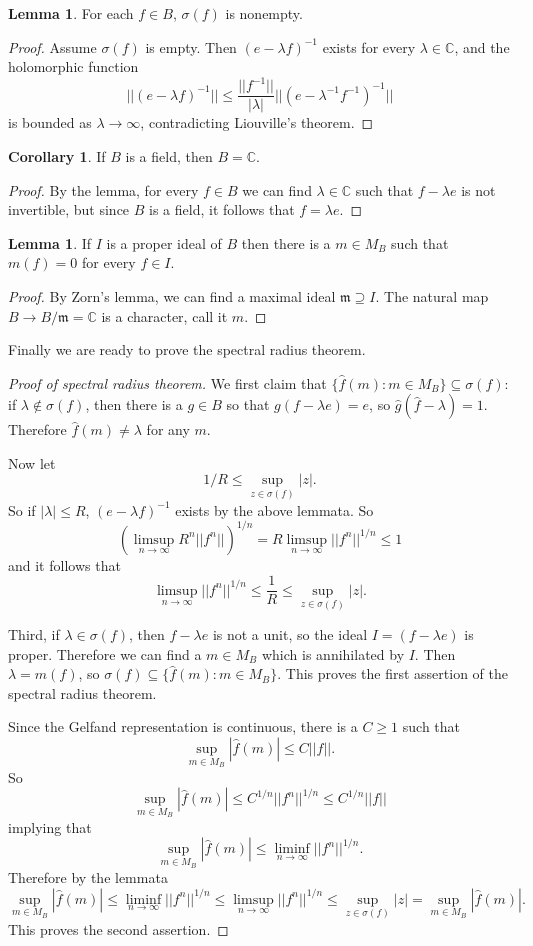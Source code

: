 \documentclass[12pt]{report}
\newcommand{\CC}{\mathbb{C}}
\theoremstyle{definition}
\newtheorem{lemma}[theorem]{Lemma}
\newtheorem{corollary}[theorem]{Corollary}
\begin{document}
\begin{lemma}
    For each $f \in B$, $\sigma(f)$ is nonempty.
\end{lemma}
\begin{proof}
    Assume $\sigma(f)$ is empty. Then $(e - \lambda f)^{-1}$ exists for every $\lambda \in \CC$, and the holomorphic function
    $$||(e - \lambda f)^{-1}|| \leq \frac{||f^{-1}||}{|\lambda|}||(e - \lambda^{-1}f^{-1})^{-1}||$$
    is bounded as $\lambda\to \infty$, contradicting Liouville's theorem.
\end{proof}
\begin{corollary}
    If $B$ is a field, then $B = \CC$.
\end{corollary}
\begin{proof}
    By the lemma, for every $f \in B$ we can find $\lambda \in \CC$ such that $f - \lambda e$ is not invertible, but since $B$ is a field, it follows that $f = \lambda e$.
\end{proof}
\begin{lemma}
    If $I$ is a proper ideal of $B$ then there is a $m \in M_B$ such that $m(f) = 0$ for every $f \in I$.
\end{lemma}
\begin{proof}
    By Zorn's lemma, we can find a maximal ideal $\mathfrak m \supseteq I$. The natural map $B \to B/\mathfrak m = \CC$ is a character, call it $m$.
\end{proof}
    Finally we are ready to prove the spectral radius theorem.
\begin{proof}[Proof of spectral radius theorem]
    We first claim that $\{\hat f(m): m \in M_B\} \subseteq \sigma(f)$: if $\lambda \notin \sigma(f)$, then there is a $g \in B$ so that $g(f - \lambda e) = e$, so $\hat g(\hat f - \lambda) = 1$. Therefore $\hat f(m) \neq \lambda$ for any $m$.
    
    Now let
    $$1/R \leq \sup_{z \in \sigma(f)} |z|.$$
    So if $|\lambda| \leq R$, $(e-\lambda f)^{-1}$ exists by the above lemmata. So
    $$\left(\limsup_{n \to \infty} R^n||f^n||\right)^{1/n} =  R\limsup_{n \to \infty}||f^n||^{1/n} \leq 1$$
    and it follows that
    $$\limsup_{n \to \infty} ||f^n||^{1/n} \leq \frac{1}{R} \leq \sup_{z \in \sigma(f)} |z|.$$
    
    Third, if $\lambda \in \sigma(f)$, then $f - \lambda e$ is not a unit, so the ideal $I = (f - \lambda e)$ is proper. Therefore we can find a $m \in M_B$ which is annihilated by $I$. Then $\lambda = m(f)$, so $\sigma(f) \subseteq \{\hat f(m): m \in M_B\}$. This proves the first assertion of the spectral radius theorem.
    
    Since the Gelfand representation is continuous, there is a $C \geq 1$ such that
    $$\sup_{m \in M_B} |\hat f(m)| \leq C||f||.$$
    So
    $$\sup_{m \in M_B} |\hat f(m)| \leq C^{1/n} ||f^n||^{1/n} \leq C^{1/n}||f||$$
    implying that
    $$\sup_{m \in M_B} |\hat f(m)| \leq \liminf_{n \to \infty} ||f^n||^{1/n}.$$
    Therefore by the lemmata
    $$\sup_{m \in M_B} |\hat f(m)| \leq \liminf_{n \to \infty} ||f^n||^{1/n} \leq \limsup_{n \to \infty} ||f^n||^{1/n} \leq \sup_{z \in \sigma(f)} |z| = \sup_{m \in M_B} |\hat f(m)|.$$
    This proves the second assertion.
\end{proof}
\end{document}
